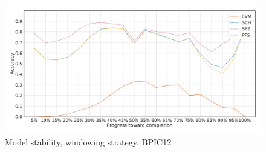 \begin{figure}[!htb]
    \centering
    \includegraphics[width=\textwidth]{gfx/bpic2012/windowed_stability.pdf}
    \caption{Model stability, windowing strategy, BPIC12}
    \label{fig:bpic12-windowed-stability}
\end{figure}
\FloatBarrier


